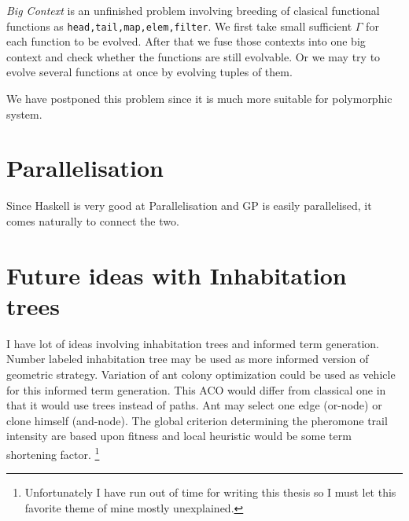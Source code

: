 \documentclass[12pt,a4paper]{report}
\begin{document}
\textit{Big Context} is an unfinished problem 
involving breeding of clasical functional functions
as \texttt{head,tail,map,elem,filter}. We first take
small sufficient $\Gamma$ for each function to be evolved.
After that we  fuse those contexts into one big context and check whether the functions are still evolvable. Or we may try to 
evolve several functions at once by evolving tuples of them.

We have postponed this problem since it is much more suitable
for polymorphic system.

\section{Parallelisation}
Since Haskell is very good at Parallelisation 
and GP is easily parallelised, it comes naturally to 
connect the two.





\section{Future ideas with Inhabitation trees}

I have lot of ideas involving inhabitation trees and 
informed term generation. Number labeled 
inhabitation tree may be used as more informed
version of geometric strategy. 
Variation of ant colony optimization
could be used as vehicle for this informed
term generation. This ACO would differ
from classical one in that
it would use trees instead of paths.
Ant may select one edge (or-node)
or clone himself (and-node). The global criterion 
determining the pheromone trail intensity 
are based upon fitness and local heuristic
would be some term shortening factor.  \footnote{
Unfortunately I have run out of time for writing this
thesis so I must let this favorite theme of mine mostly unexplained.}


\end{document}
